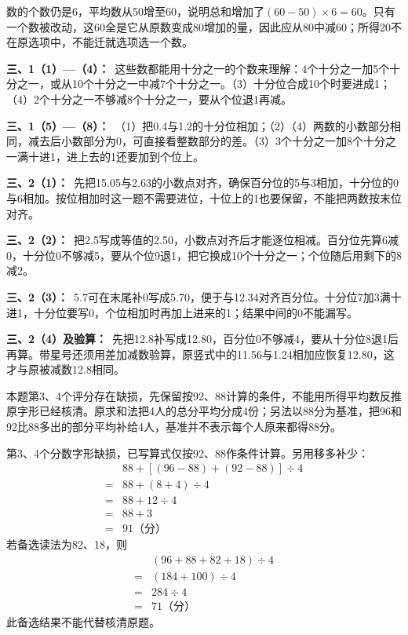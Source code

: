 \documentclass[multi=snippet,border=0pt]{standalone}
\newenvironment{snippet}[3]{\begin{minipage}{#1bp}\color{answerred}\fontsize{#2}{#3}\selectfont\raggedright}{\end{minipage}}
\begin{document}
\begin{snippet}{505}{11.5}{14}数的个数仍是6，平均数从50增至60，说明总和增加了\((60-50)\times6=60\)。只有一个数被改动，这60全是它从原数变成80增加的量，因此应从80中减60；所得20不在原选项中，不能迁就选项选一个数。\end{snippet}
\begin{snippet}{505}{11.5}{14}\textbf{三、1（1）—（4）：}\ 这些数都能用十分之一的个数来理解：4个十分之一加5个十分之一，或从10个十分之一中减7个十分之一。（3）十分位合成10个时要进成1；（4）2个十分之一不够减8个十分之一，要从个位退1再减。\end{snippet}
\begin{snippet}{505}{11.5}{14}\textbf{三、1（5）—（8）：}\ （1）把0.4与1.2的十分位相加；（2）（4）两数的小数部分相同，减去后小数部分为0，可直接看整数部分的差。（3）3个十分之一加8个十分之一满十进1，进上去的1还要加到个位上。\end{snippet}
\begin{snippet}{505}{11.5}{14}\textbf{三、2（1）：}\ 先把15.05与2.63的小数点对齐，确保百分位的5与3相加，十分位的0与6相加。按位相加时这一题不需要进位，十位上的1也要保留，不能把两数按末位对齐。\end{snippet}
\begin{snippet}{505}{11.5}{14}\textbf{三、2（2）：}\ 把2.5写成等值的2.50，小数点对齐后才能逐位相减。百分位先算6减0，十分位0不够减5，要从个位9退1，把它换成10个十分之一；个位随后用剩下的8减2。\end{snippet}
\begin{snippet}{505}{11.5}{14}\textbf{三、2（3）：}\ 5.7可在末尾补0写成5.70，便于与12.34对齐百分位。十分位7加3满十进1，十分位要写0，个位相加时再加上进来的1；结果中间的0不能漏写。\end{snippet}
\begin{snippet}{505}{11.5}{14}\textbf{三、2（4）及验算：}\ 先把12.8补写成12.80，百分位0不够减4，要从十分位8退1后再算。带星号还须用差加减数验算，原竖式中的11.56与1.24相加应恢复12.80，这才与原被减数12.8相同。\end{snippet}
\begin{snippet}{505}{11.5}{14}本题第3、4个评分存在缺损，先保留按92、88计算的条件，不能用所得平均数反推原字形已经核清。原求和法把4人的总分平均分成4份；另法以88分为基准，把96和92比88多出的部分平均补给4人，基准并不表示每个人原来都得88分。\par 第3、4个分数字形缺损，已写算式仅按92、88作条件计算。另用移多补少：\[\begin{aligned}&88+[(96-88)+(92-88)]\div4\\={}&88+(8+4)\div4\\={}&88+12\div4\\={}&88+3\\={}&91\text{（分）}\end{aligned}\]若备选读法为82、18，则\[\begin{aligned}&(96+88+82+18)\div4\\={}&(184+100)\div4\\={}&284\div4\\={}&71\text{（分）}\end{aligned}\]此备选结果不能代替核清原题。\end{snippet}
\end{document}

